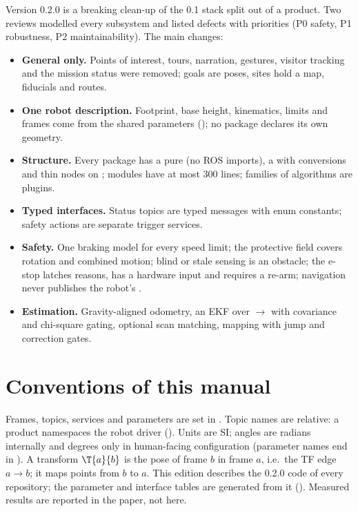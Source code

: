 Version 0.2.0 is a breaking clean-up of the 0.1 stack split out of a product. Two reviews
modelled every subsystem and listed defects with priorities (P0 safety, P1 robustness, P2
maintainability). The main changes:
\begin{itemize}
  \item \textbf{General only.} Points of interest, tours, narration, gestures, visitor tracking
    and the mission status were removed; goals are poses, sites hold a map, fiducials and
    routes.
  \item \textbf{One robot description.} Footprint, base height, kinematics, limits and frames
    come from the shared  parameters (); no package declares
    its own geometry.
  \item \textbf{Structure.} Every package has a pure  (no ROS imports), a
     with conversions and thin nodes on ; modules have at most
    300 lines; families of algorithms are plugins.
  \item \textbf{Typed interfaces.} Status topics are typed messages with enum constants;
    safety actions are separate trigger services.
  \item \textbf{Safety.} One braking model for every speed limit; the protective field covers
    rotation and combined motion; blind or stale sensing is an obstacle; the e-stop latches
    reasons, has a hardware input and requires a re-arm; navigation never publishes the
    robot's .
  \item \textbf{Estimation.} Gravity-aligned odometry, an EKF over $\to$ with
    covariance and chi-square gating, optional scan matching, mapping with jump and correction
    gates.
\end{itemize}

\section{Conventions of this manual}

Frames, topics, services and parameters are set in . Topic names are
relative: a product namespaces the robot driver (). Units are SI; angles
are radians internally and degrees only in human-facing configuration (parameter names end in
). A transform $\T{a}{b}$ is the pose of frame $b$ in frame $a$, i.e.\ the TF edge
$a \to b$; it maps points from $b$ to $a$. This edition describes the 0.2.0 code of every
repository; the parameter and interface tables are generated from it
(). Measured results are reported in the paper, not here.

